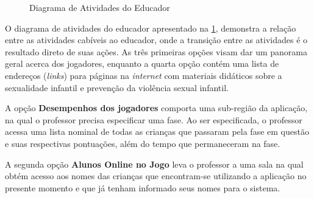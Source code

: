 \documentclass[alpha-refs,brazilian]{RBCA_v2.0}
\begin{document}
 \begin{figure}[h]
  \centering
  \caption{Diagrama de Atividades do Educador \citep{diocesano2018jogo}} 
  \label{fig:DiagramaCoordenar}
\end{figure}

O diagrama de atividades do educador apresentado na \cref{fig:DiagramaCoordenar}, demonstra a relação entre as atividades cabíveis ao educador, onde a transição entre as atividades é o resultado direto de suas ações. As três primeiras opções visam  dar um panorama geral acerca dos jogadores, enquanto a quarta opção contém uma lista de endereços (\textit{links}) para páginas na \textit{internet} com materiais didáticos sobre a sexualidade infantil e prevenção da violência sexual infantil. 

A opção \textbf{Desempenhos dos jogadores} comporta uma sub-região da aplicação, na qual o professor precisa especificar uma fase. Ao ser especificada, o professor acessa uma lista nominal de todas as crianças que passaram pela fase em questão e suas respectivas pontuações, além do tempo que permaneceram na fase.

A segunda opção \textbf{Alunos Online no Jogo} leva o professor a uma sala na qual obtém acesso aos nomes das crianças que encontram-se utilizando a aplicação no presente momento e que já tenham informado seus nomes para o sistema. 
\end{document}
